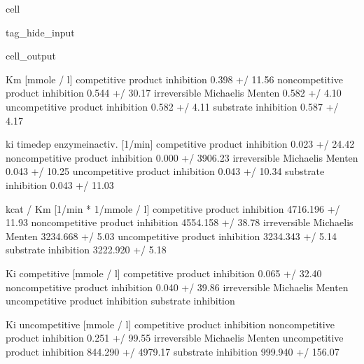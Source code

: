 \documentclass[letterpaper,10pt,english]{jupyterBook}
\begin{document}
\begin{sphinxuseclass}{cell}
\begin{sphinxuseclass}{tag_hide_input}
\begin{sphinxVerbatimOutput}
\begin{sphinxuseclass}{cell_output}
\begin{sphinxVerbatim}[commandchars=\\\{\}]
                                      Km [mmole / l]  \PYGZbs{}
competitive product inhibition      0.398 +/\PYGZhy{} 11.56\PYGZpc{}   
non\PYGZhy{}competitive product inhibition  0.544 +/\PYGZhy{} 30.17\PYGZpc{}   
irreversible Michaelis Menten        0.582 +/\PYGZhy{} 4.10\PYGZpc{}   
uncompetitive product inhibition     0.582 +/\PYGZhy{} 4.11\PYGZpc{}   
substrate inhibition                 0.587 +/\PYGZhy{} 4.17\PYGZpc{}   

                                   ki time\PYGZhy{}dep enzyme\PYGZhy{}inactiv. [1/min]  \PYGZbs{}
competitive product inhibition                        0.023 +/\PYGZhy{} 24.42\PYGZpc{}   
non\PYGZhy{}competitive product inhibition                  0.000 +/\PYGZhy{} 3906.23\PYGZpc{}   
irreversible Michaelis Menten                         0.043 +/\PYGZhy{} 10.25\PYGZpc{}   
uncompetitive product inhibition                      0.043 +/\PYGZhy{} 10.34\PYGZpc{}   
substrate inhibition                                  0.043 +/\PYGZhy{} 11.03\PYGZpc{}   

                                   kcat / Km [1/min * 1/mmole / l]  \PYGZbs{}
competitive product inhibition                 4716.196 +/\PYGZhy{} 11.93\PYGZpc{}   
non\PYGZhy{}competitive product inhibition             4554.158 +/\PYGZhy{} 38.78\PYGZpc{}   
irreversible Michaelis Menten                   3234.668 +/\PYGZhy{} 5.03\PYGZpc{}   
uncompetitive product inhibition                3234.343 +/\PYGZhy{} 5.14\PYGZpc{}   
substrate inhibition                            3222.920 +/\PYGZhy{} 5.18\PYGZpc{}   

                                   Ki competitive [mmole / l]  \PYGZbs{}
competitive product inhibition               0.065 +/\PYGZhy{} 32.40\PYGZpc{}   
non\PYGZhy{}competitive product inhibition           0.040 +/\PYGZhy{} 39.86\PYGZpc{}   
irreversible Michaelis Menten                               \PYGZhy{}   
uncompetitive product inhibition                            \PYGZhy{}   
substrate inhibition                                        \PYGZhy{}   

                                   Ki uncompetitive [mmole / l]  
competitive product inhibition                                \PYGZhy{}  
non\PYGZhy{}competitive product inhibition             0.251 +/\PYGZhy{} 99.55\PYGZpc{}  
irreversible Michaelis Menten                                 \PYGZhy{}  
uncompetitive product inhibition           844.290 +/\PYGZhy{} 4979.17\PYGZpc{}  
substrate inhibition                        999.940 +/\PYGZhy{} 156.07\PYGZpc{}  
\end{sphinxVerbatim}

\end{sphinxuseclass}\end{sphinxVerbatimOutput}

\end{sphinxuseclass}
\end{sphinxuseclass}
\end{document}
